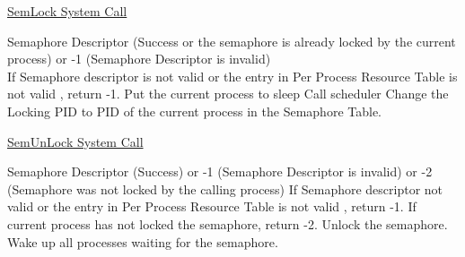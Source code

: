 
\begin{algorithm}
\caption{\href{http://exposnitc.github.io/os_design-files/semaphore_algos.html#semlock}{SemLock System Call}}
\begin{algorithmic}
\REQUIRE Semaphore Descriptor
 (Success or the semaphore is already locked by the current process) or -1 (Semaphore Descriptor is invalid)
\\
\STATE If Semaphore descriptor is not valid or the entry in Per Process Resource Table is not valid , return -1.
    \STATE Put the current process to sleep 
    \STATE Call scheduler
\ENDWHILE
\STATE Change the Locking PID to PID of the current process in the Semaphore Table.
\end{algorithmic}
\end{algorithm}


\begin{algorithm}
\caption{\href{http://exposnitc.github.io/os_design-files/semaphore_algos.html#semunlock}{SemUnLock System Call}}
\begin{algorithmic}
\REQUIRE Semaphore Descriptor
 (Success) or -1 (Semaphore Descriptor is invalid) or -2 (Semaphore was not locked by the calling process)
\STATE If Semaphore descriptor not valid or the entry in Per Process Resource Table is not valid , return -1.
    \STATE If current process has not locked the semaphore, return -2.
    \STATE Unlock the semaphore.
    \STATE Wake up all processes waiting for the semaphore.
\ENDIF
{}
\end{algorithmic}
\end{algorithm}




